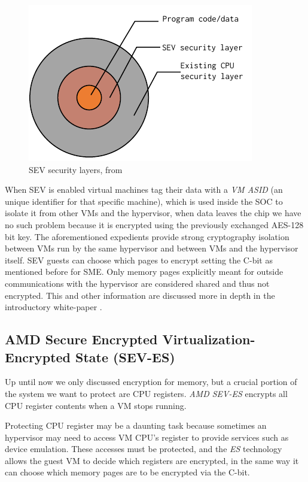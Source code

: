 \documentclass[twocolumn]{article}
\begin{document}
\begin{figure}
    \centering
    \includegraphics[scale=0.9]{img/security-layers.pdf}
    \caption{SEV security layers, from \cite{memory-encryption}}
\end{figure}

When SEV is enabled virtual machines tag their data with a \textit{VM ASID} (an unique identifier for that specific machine), which is used inside the SOC to isolate it from other VMs and the hypervisor, when data leaves the chip we have no such problem because it is encrypted using the previously exchanged AES-128 bit key. The aforementioned expedients provide strong cryptography isolation between VMs run by the same hypervisor and between VMs and the hypervisor itself. SEV guests can choose which pages to encrypt setting the C-bit as mentioned before for SME. Only memory pages explicitly meant for outside communications with the hypervisor are considered shared and thus not encrypted. This and other information are discussed more in depth in the introductory white-paper \cite{memory-encryption}.

\subsection{AMD Secure Encrypted Virtualization-Encrypted State (SEV-ES)}

Up until now we only discussed encryption for memory, but a crucial portion of the system we want to protect are CPU registers. \textit{AMD SEV-ES} encrypts all CPU register contents when a VM stops running.

Protecting CPU register may be a daunting task because sometimes an hypervisor may need to access VM CPU's register to provide services such as device emulation. These accesses must be protected, and the \textit{ES} technology allows the guest VM to decide which registers are encrypted, in the same way it can choose which memory pages are to be encrypted via the C-bit.
\end{document}
